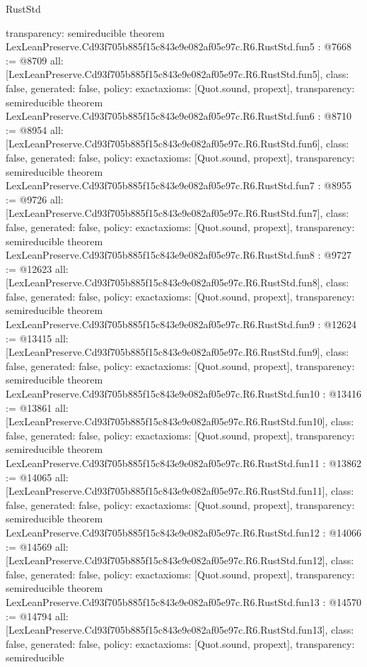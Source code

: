 \begin{lexlean}{RustStd}
\begin{coremodule}
{  transparency: semireducible
}
theorem LexLeanPreserve.Cd93f705b885f15c843e9e082af05e97c.R6.RustStd.fun5 : @7668 := @8709 {
  all: [LexLeanPreserve.Cd93f705b885f15c843e9e082af05e97c.R6.RustStd.fun5],
  class: false,
  generated: false,
  policy: exact{axioms: [Quot.sound, propext]},
  transparency: semireducible
}
theorem LexLeanPreserve.Cd93f705b885f15c843e9e082af05e97c.R6.RustStd.fun6 : @8710 := @8954 {
  all: [LexLeanPreserve.Cd93f705b885f15c843e9e082af05e97c.R6.RustStd.fun6],
  class: false,
  generated: false,
  policy: exact{axioms: [Quot.sound, propext]},
  transparency: semireducible
}
theorem LexLeanPreserve.Cd93f705b885f15c843e9e082af05e97c.R6.RustStd.fun7 : @8955 := @9726 {
  all: [LexLeanPreserve.Cd93f705b885f15c843e9e082af05e97c.R6.RustStd.fun7],
  class: false,
  generated: false,
  policy: exact{axioms: [Quot.sound, propext]},
  transparency: semireducible
}
theorem LexLeanPreserve.Cd93f705b885f15c843e9e082af05e97c.R6.RustStd.fun8 : @9727 := @12623 {
  all: [LexLeanPreserve.Cd93f705b885f15c843e9e082af05e97c.R6.RustStd.fun8],
  class: false,
  generated: false,
  policy: exact{axioms: [Quot.sound, propext]},
  transparency: semireducible
}
theorem LexLeanPreserve.Cd93f705b885f15c843e9e082af05e97c.R6.RustStd.fun9 : @12624 := @13415 {
  all: [LexLeanPreserve.Cd93f705b885f15c843e9e082af05e97c.R6.RustStd.fun9],
  class: false,
  generated: false,
  policy: exact{axioms: [Quot.sound, propext]},
  transparency: semireducible
}
theorem LexLeanPreserve.Cd93f705b885f15c843e9e082af05e97c.R6.RustStd.fun10 : @13416 := @13861 {
  all: [LexLeanPreserve.Cd93f705b885f15c843e9e082af05e97c.R6.RustStd.fun10],
  class: false,
  generated: false,
  policy: exact{axioms: [Quot.sound, propext]},
  transparency: semireducible
}
theorem LexLeanPreserve.Cd93f705b885f15c843e9e082af05e97c.R6.RustStd.fun11 : @13862 := @14065 {
  all: [LexLeanPreserve.Cd93f705b885f15c843e9e082af05e97c.R6.RustStd.fun11],
  class: false,
  generated: false,
  policy: exact{axioms: [Quot.sound, propext]},
  transparency: semireducible
}
theorem LexLeanPreserve.Cd93f705b885f15c843e9e082af05e97c.R6.RustStd.fun12 : @14066 := @14569 {
  all: [LexLeanPreserve.Cd93f705b885f15c843e9e082af05e97c.R6.RustStd.fun12],
  class: false,
  generated: false,
  policy: exact{axioms: [Quot.sound, propext]},
  transparency: semireducible
}
theorem LexLeanPreserve.Cd93f705b885f15c843e9e082af05e97c.R6.RustStd.fun13 : @14570 := @14794 {
  all: [LexLeanPreserve.Cd93f705b885f15c843e9e082af05e97c.R6.RustStd.fun13],
  class: false,
  generated: false,
  policy: exact{axioms: [Quot.sound, propext]},
  transparency: semireducible
}
\end{coremodule}
\end{lexlean}
